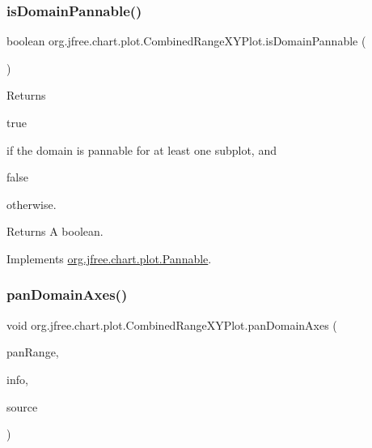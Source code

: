 \subsubsection{\texorpdfstring{is\+Domain\+Pannable()}{isDomainPannable()}}
{\footnotesize\ttfamily boolean org.\+jfree.\+chart.\+plot.\+Combined\+Range\+X\+Y\+Plot.\+is\+Domain\+Pannable (\begin{DoxyParamCaption}{ }\end{DoxyParamCaption})}

Returns
\begin{DoxyCode}
\textcolor{keyword}{true} 
\end{DoxyCode}
 if the domain is pannable for at least one subplot, and
\begin{DoxyCode}
\textcolor{keyword}{false} 
\end{DoxyCode}
 otherwise.

\begin{DoxyReturn}{Returns}
A boolean. 
\end{DoxyReturn}


Implements \mbox{\hyperlink{interfaceorg_1_1jfree_1_1chart_1_1plot_1_1_pannable_a732908d75e7c0b1fab688d9a29ff3e44}{org.\+jfree.\+chart.\+plot.\+Pannable}}.

\mbox{\label{classorg_1_1jfree_1_1chart_1_1plot_1_1_combined_range_x_y_plot_a3124b90fe437b15a01a34a638042f9fb}} 
\subsubsection{\texorpdfstring{pan\+Domain\+Axes()}{panDomainAxes()}}
{\footnotesize\ttfamily void org.\+jfree.\+chart.\+plot.\+Combined\+Range\+X\+Y\+Plot.\+pan\+Domain\+Axes (\begin{DoxyParamCaption}\item[{double}]{pan\+Range,  }\item[{\mbox{\hyperlink{classorg_1_1jfree_1_1chart_1_1plot_1_1_plot_rendering_info}{Plot\+Rendering\+Info}}}]{info,  }\item[{Point2D}]{source }\end{DoxyParamCaption})}

